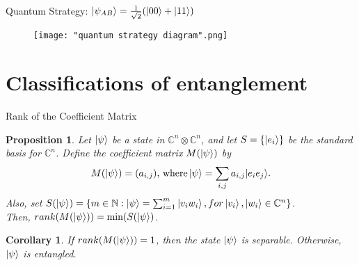 \documentclass[handout, 10 pt]{beamer}
\newtheorem{prop}{Proposition}
\newtheorem{corol}{Corollary}
\begin{document}

\begin{comment}
this can be {\emph{improved}} by making use of quantum mechanics!  The idea is that Alice and Bob can make use of a strategy where even though neither sees which question the other is asked, their answers are {\emph{correlated}}.
\begin{equation*}
    \ket{\psi_{AB}}=\frac{1}{\sqrt{2}}(\ket{00}+\ket{11})
\end{equation*}


$$0.75<0.85$$
It's s simplified version of "CHSH experiment".
\end{comment}
\begin{frame}{Quantum Strategy:     $\ket{\psi_{AB}}=\frac{1}{\sqrt{2}}(\ket{00}+\ket{11})$}
    \begin{figure}[h]
    \centering
    \texttt{[image: "quantum strategy diagram".png]}
    \label{fig: quantum strategy diagram}
    \end{figure}
\end{frame}


\section{Classifications of entanglement}
\begin{frame}{Rank of the Coefficient Matrix}
\begin{prop}
\label{rank prop}
Let $\ket{\psi}$ be a state in $\mathbb{C}^n \otimes \mathbb{C}^n$, and let $S=\{\ket{e_i}\}$ be the standard basis for $\mathbb{C}^n$. Define the coefficient matrix $M(\ket{\psi})$ by
\begin{equation}
M(\ket{\psi})=(a_{i,j}) \textrm{, where}\ket{\psi}=\sum\limits_{i,j}a_{i,j}|e_i e_j\rangle . 
\end{equation}
Also, set $S(\ket{\psi})=\{m\in \mathbb{N}: \ket{\psi}=\sum_{i=1}^m\ket{v_i w_i}, for \ket{v_i}, \ket{w_i} \in \mathbb{C}^n\}$.\\  Then, $rank(M(\ket{\psi}))=\textrm{min} (S(\ket{\psi})$.
\end{prop}
\pause

\begin{corol}
If $rank(M(\ket{\psi}))=1$, then the state $\ket{\psi}$ is separable. Otherwise, $\ket{\psi}$ is entangled.
\end{corol}
\end{frame}
\end{document}
